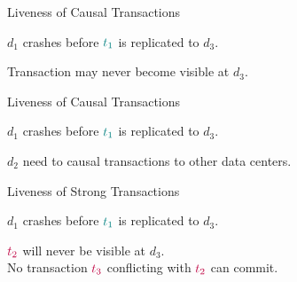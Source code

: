 \begin{frame}{Liveness of Causal Transactions}
  \begin{center}
    $d_{1}$ crashes before $\textcolor{teal}{t_{1}}$ is replicated to $d_{3}$.

    \vspace{0.20cm}

    \pause
    Transaction  may never become visible at $d_{3}$.
  \end{center}
\end{frame}

\begin{frame}{Liveness of Causal Transactions}
  \begin{center}
    $d_{1}$ crashes before $\textcolor{teal}{t_{1}}$ is replicated to $d_{3}$.

    \vspace{0.20cm}

    \pause
    $d_{2}$ need to  causal transactions to other data centers.
  \end{center}
\end{frame}

\begin{frame}{Liveness of Strong Transactions}
  \begin{center}
    $d_{1}$ crashes before $\textcolor{teal}{t_{1}}$ is replicated to $d_{3}$.

    \vspace{0.50cm}

    \pause
    \vspace{0.30cm}
    $\textcolor{purple}{t_{2}}$ will never be visible at $d_{3}$. \\[3pt]
    \pause
    No transaction $\textcolor{purple}{t_{3}}$ conflicting with $\textcolor{purple}{t_{2}}$ can commit.
  \end{center}
\end{frame}

